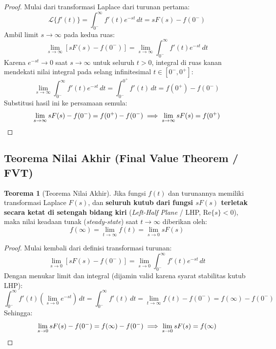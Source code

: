 \documentclass[11pt,a4paper]{article}
\theoremstyle{definition}
\newtheorem{theorem}{Teorema}[section]
\begin{document}
\begin{proof}
Mulai dari transformasi Laplace dari turunan pertama:
\begin{equation*}
    \mathcal{L}\{f'(t)\} = \int_{0^-}^{\infty} f'(t) e^{-st} \, dt = s F(s) - f(0^-)
\end{equation*}
Ambil limit $s \to \infty$ pada kedua ruas:
\begin{equation*}
    \lim_{s \to \infty} \left[ s F(s) - f(0^-) \right] = \lim_{s \to \infty} \int_{0^-}^{\infty} f'(t) e^{-st} \, dt
\end{equation*}
Karena $e^{-st} \to 0$ saat $s \to \infty$ untuk seluruh $t > 0$, integral di ruas kanan mendekati nilai integral pada selang infinitesimal $t \in [0^-, 0^+]$:
\begin{equation*}
    \lim_{s \to \infty} \int_{0^-}^{\infty} f'(t) e^{-st} \, dt = \int_{0^-}^{0^+} f'(t) \, dt = f(0^+) - f(0^-)
\end{equation*}
Substitusi hasil ini ke persamaan semula:
\begin{equation*}
    \lim_{s \to \infty} s F(s) - f(0^-) = f(0^+) - f(0^-) \implies \lim_{s \to \infty} s F(s) = f(0^+) \qedhere
\end{equation*}
\end{proof}

\subsection{Teorema Nilai Akhir (Final Value Theorem / FVT)}

\begin{theorem}[Teorema Nilai Akhir]
Jika fungsi $f(t)$ dan turunannya memiliki transformasi Laplace $F(s)$, dan \textbf{seluruh kutub dari fungsi $s F(s)$ terletak secara ketat di setengah bidang kiri} (\textit{Left-Half Plane} / LHP, $\text{Re}\{s\} < 0$), maka nilai keadaan tunak (\textit{steady-state}) saat $t \to \infty$ diberikan oleh:
\begin{equation}
    f(\infty) = \lim_{t \to \infty} f(t) = \lim_{s \to 0} s F(s)
    \label{eq:fvt_theorem}
\end{equation}
\end{theorem}

\begin{proof}
Mulai kembali dari definisi transformasi turunan:
\begin{equation*}
    \lim_{s \to 0} \left[ s F(s) - f(0^-) \right] = \lim_{s \to 0} \int_{0^-}^{\infty} f'(t) e^{-st} \, dt
\end{equation*}
Dengan menukar limit dan integral (dijamin valid karena syarat stabilitas kutub LHP):
\begin{equation*}
    \int_{0^-}^{\infty} f'(t) \left( \lim_{s \to 0} e^{-st} \right) \, dt = \int_{0^-}^{\infty} f'(t) \, dt = \lim_{t \to \infty} f(t) - f(0^-) = f(\infty) - f(0^-)
\end{equation*}
Sehingga:
\begin{equation*}
    \lim_{s \to 0} s F(s) - f(0^-) = f(\infty) - f(0^-) \implies \lim_{s \to 0} s F(s) = f(\infty) \qedhere
\end{equation*}
\end{proof}
\end{document}
